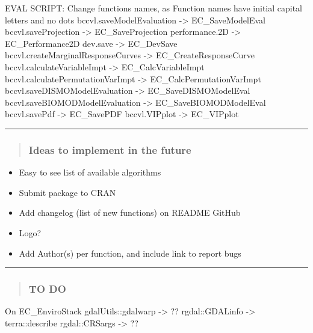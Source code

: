 \documentclass[
]{article}
\providecommand{\tightlist}{%
  \setlength{\itemsep}{0pt}\setlength{\parskip}{0pt}}
\begin{document}
EVAL SCRIPT: Change functions names, as Function names have initial
capital letters and no dots bccvl.saveModelEvaluation -\textgreater{}
EC\_SaveModelEval bccvl.saveProjection -\textgreater{}
EC\_SaveProjection performance.2D -\textgreater{} EC\_Performance2D
dev.save -\textgreater{} EC\_DevSave bccvl.createMarginalResponseCurves
-\textgreater{} EC\_CreateResponseCurve bccvl.calculateVariableImpt
-\textgreater{} EC\_CalcVariableImpt bccvl.calculatePermutationVarImpt
-\textgreater{} EC\_CalcPermutationVarImpt
bccvl.saveDISMOModelEvaluation -\textgreater{} EC\_SaveDISMOModelEval
bccvl.saveBIOMODModelEvaluation -\textgreater{} EC\_SaveBIOMODModelEval
bccvl.savePdf -\textgreater{} EC\_SavePDF bccvl.VIPplot -\textgreater{}
EC\_VIPplot

\begin{center}\rule{0.5\linewidth}{0.5pt}\end{center}

\begin{quote}
\hypertarget{ideas-to-implement-in-the-future}{%
\subsubsection{\texorpdfstring{\textbf{Ideas to implement in the
future}}{Ideas to implement in the future}}\label{ideas-to-implement-in-the-future}}
\end{quote}

\begin{itemize}
\tightlist
\item
  Easy to see list of available algorithms
\item
  Submit package to CRAN
\item
  Add changelog (list of new functions) on README GitHub
\item
  Logo?
\item
  Add Author(s) per function, and include link to report bugs
\end{itemize}

\begin{center}\rule{0.5\linewidth}{0.5pt}\end{center}

\begin{quote}
\hypertarget{to-do}{%
\subsubsection{\texorpdfstring{\textbf{TO DO}}{TO DO}}\label{to-do}}
\end{quote}

On EC\_EnviroStack gdalUtils::gdalwarp -\textgreater{} ??
rgdal::GDALinfo -\textgreater{} terra::describe rgdal::CRSargs
-\textgreater{} ??
\end{document}
